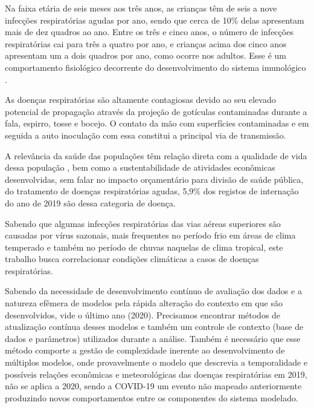 \documentclass[journal]{IEEEtran}
\begin{document}
Na faixa etária de seis meses aos três anos, as crianças têm de seis a nove infecções respiratórias agudas por ano, sendo que  cerca  de  10\%  delas  apresentam  mais  de  dez  quadros  ao  ano.  Entre  os  três  e  cinco  anos,  o  número  de  infecções  respiratórias cai para três a quatro por ano, e crianças acima dos cinco anos apresentam um a dois quadros por ano, como ocorre nos adultos. Esse é um comportamento fisiológico decorrente do desenvolvimento do sistema imunológico \cite{infeccao}.

As doenças respiratórias são altamente contagiosas devido ao seu elevado potencial de propagação através da projeção de gotículas contaminadas durante a fala, espirro, tosse e bocejo.  O contato da mão com superfícies contaminadas e em seguida a auto inoculação com essa constitui a principal via de transmissão.

A relevância da saúde das populações têm relação direta com a qualidade de vida dessa população \cite{sdgsonu}, bem como a sustentabilidade de atividades econômicas desenvolvidas, sem falar no impacto orçamentário para divisão de saúde pública, do tratamento de doenças respiratórias agudas, 5,9\% dos registos de internação do ano de 2019\cite{ansdoencarespiratoria} são dessa categoria de doença.

Sabendo que algumas infecções respiratórias das vias aéreas superiores são causadas por vírus sazonais, mais frequentes no período frio em áreas de clima temperado e também no período de chuvas naquelas de clima tropical\cite{azevedo_santos_silva_olinda_santos_2017}, este trabalho busca correlacionar condições climáticas a casos de doenças respiratórias.

Sabendo da necessidade de desenvolvimento contínuo de avaliação dos dados e a natureza efêmera de modelos pela rápida alteração do contexto em que são desenvolvidos, vide o último ano (2020). Precisamos encontrar métodos de atualização contínua desses modelos e também um controle de contexto (base de dados e parâmetros) utilizados durante a análise. Também é necessário que esse método comporte a gestão de complexidade inerente ao desenvolvimento de múltiplos modelos, onde provavelmente o modelo que descrevia a temporalidade e possíveis relações econômicas e meteorológicas das doenças respiratórias em 2019, não se aplica a 2020, sendo a COVID-19 um evento não mapeado anteriormente produzindo novos comportamentos entre os componentes do sistema modelado.

 
\end{document}
